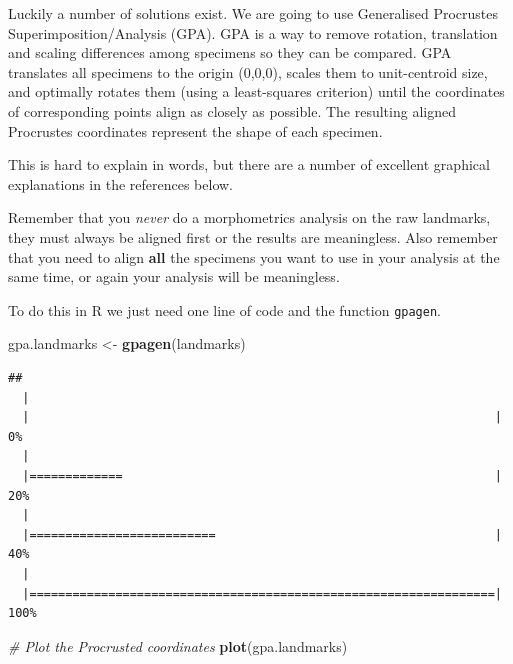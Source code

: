 \documentclass[]{book}
\newenvironment{Shaded}{\begin{snugshade}}{\end{snugshade}}
\newcommand{\KeywordTok}[1]{\textcolor[rgb]{0.13,0.29,0.53}{\textbf{{#1}}}}
\newcommand{\StringTok}[1]{\textcolor[rgb]{0.31,0.60,0.02}{{#1}}}
\newcommand{\CommentTok}[1]{\textcolor[rgb]{0.56,0.35,0.01}{\textit{{#1}}}}
\newcommand{\NormalTok}[1]{{#1}}
\theoremstyle{definition}
\theoremstyle{definition}
\theoremstyle{definition}
\theoremstyle{remark}
\begin{document}
Luckily a number of solutions exist. We are going to use Generalised
Procrustes Superimposition/Analysis (GPA). GPA is a way to remove
rotation, translation and scaling differences among specimens so they
can be compared. GPA translates all specimens to the origin (0,0,0),
scales them to unit-centroid size, and optimally rotates them (using a
least-squares criterion) until the coordinates of corresponding points
align as closely as possible. The resulting aligned Procrustes
coordinates represent the shape of each specimen.

This is hard to explain in words, but there are a number of excellent
graphical explanations in the references below.

Remember that you \emph{never} do a morphometrics analysis on the raw
landmarks, they must always be aligned first or the results are
meaningless. Also remember that you need to align \textbf{all} the
specimens you want to use in your analysis at the same time, or again
your analysis will be meaningless.

To do this in R we just need one line of code and the function
\texttt{gpagen}.

\begin{Shaded}
\begin{Highlighting}[]
\NormalTok{gpa.landmarks <-}\StringTok{ }\KeywordTok{gpagen}\NormalTok{(landmarks)}
\end{Highlighting}
\end{Shaded}

\begin{verbatim}
## 
  |                                                                       
  |                                                                 |   0%
  |                                                                       
  |=============                                                    |  20%
  |                                                                       
  |==========================                                       |  40%
  |                                                                       
  |=================================================================| 100%
\end{verbatim}

\begin{Shaded}
\begin{Highlighting}[]
\CommentTok{# Plot the Procrusted coordinates }
\KeywordTok{plot}\NormalTok{(gpa.landmarks)}
\end{Highlighting}
\end{Shaded}
\end{document}
